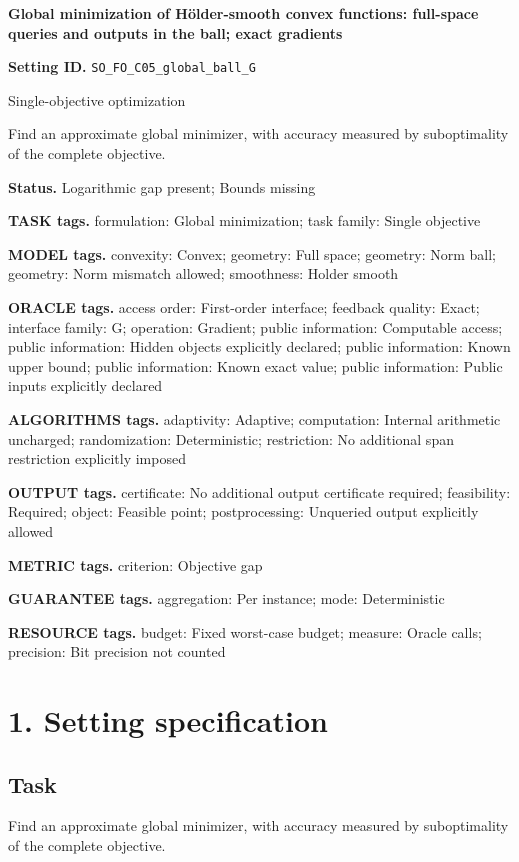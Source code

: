 \documentclass[10pt,a4paper]{article}
\begin{document}
\raggedright

{\LARGE\bfseries\sffamily\color{AtlasNavy} Global minimization of Hölder-smooth convex functions: full-space queries and outputs in the ball; exact gradients\par}\vspace{5pt}
\textbf{Setting ID.} \texttt{SO\_\allowbreak{}FO\_\allowbreak{}C05\_\allowbreak{}global\_\allowbreak{}ball\_\allowbreak{}G}

Single-objective optimization

Find an approximate global minimizer, with accuracy measured by suboptimality of the complete objective.

\textbf{Status.} Logarithmic gap present; Bounds missing

\textbf{TASK tags.} formulation: Global minimization; task family: Single objective

\textbf{MODEL tags.} convexity: Convex; geometry: Full space; geometry: Norm ball; geometry: Norm mismatch allowed; smoothness: Holder smooth

\textbf{ORACLE tags.} access order: First-order interface; feedback quality: Exact; interface family: G; operation: Gradient; public information: Computable access; public information: Hidden objects explicitly declared; public information: Known upper bound; public information: Known exact value; public information: Public inputs explicitly declared

\textbf{ALGORITHMS tags.} adaptivity: Adaptive; computation: Internal arithmetic uncharged; randomization: Deterministic; restriction: No additional span restriction explicitly imposed

\textbf{OUTPUT tags.} certificate: No additional output certificate required; feasibility: Required; object: Feasible point; postprocessing: Unqueried output explicitly allowed

\textbf{METRIC tags.} criterion: Objective gap

\textbf{GUARANTEE tags.} aggregation: Per instance; mode: Deterministic

\textbf{RESOURCE tags.} budget: Fixed worst-case budget; measure: Oracle calls; precision: Bit precision not counted

\section{1. Setting specification}
\subsection{Task}
Find an approximate global minimizer, with accuracy measured by suboptimality of the complete objective.
\end{document}
